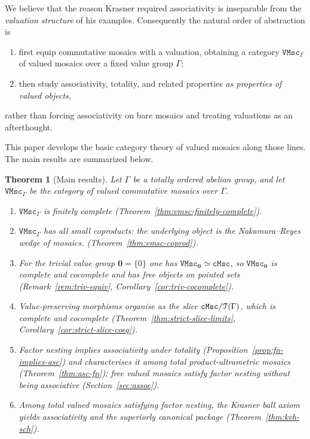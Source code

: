 \documentclass[11pt]{amsart}
\theoremstyle{plain}
\newtheorem{theorem}{Theorem}[section]
\theoremstyle{definition}
\theoremstyle{remark}
\newcommand{\T}{\EuScript{T}}
\newcommand{\cMsc}{\mathtt{cMsc}}
\newcommand{\VMsc}{\mathtt{VMsc}}
\newcommand{\VMscG}{\mathtt{VMsc}_{\Gamma}}
\begin{document}
We believe that the reason Krasner required associativity is inseparable from the \emph{valuation structure} of his examples. Consequently the natural order of abstraction is
\begin{enumerate}[label=(\roman*)]
\item first equip commutative mosaics with a valuation, obtaining a category \(\VMscG\) of valued mosaics over a fixed value group \(\Gamma\);
\item then study associativity, totality, and related properties \emph{as properties of valued objects},
\end{enumerate}
rather than forcing associativity on bare mosaics and treating valuations as an afterthought.

This paper develops the basic category theory of valued mosaics along those lines. The main results are summarized below.

\begin{theorem}[Main results]
\label{thm:intro-main}
Let \(\Gamma\) be a totally ordered abelian group, and let \(\VMscG\) be the category of valued commutative mosaics over \(\Gamma\).
\begin{enumerate}[label=(\alph*)]
\item\label{intro-a} \(\VMscG\) is finitely complete (Theorem~\ref{thm:vmsc-finitely-complete}).
\item\label{intro-b} \(\VMscG\) has all small coproducts: the underlying object is the Nakamura--Reyes wedge of mosaics. (Theorem~\ref{thm:vmsc-coprod}).
\item\label{intro-c} For the trivial value group \(\mathbf{0}=\{0\}\) one has \(\VMsc_{\mathbf{0}}\simeq\cMsc\), so \(\VMsc_{\mathbf{0}}\) is complete and cocomplete and has free objects on pointed sets (Remark~\ref{rem:triv-equiv}, Corollary~\ref{cor:triv-cocomplete}).
\item\label{intro-d} Value-preserving morphisms organise as the slice \(\cMsc/\T(\Gamma)\), which is complete and cocomplete (Theorem~\ref{thm:strict-slice-limits}, Corollary~\ref{cor:strict-slice-coeq}).
\item\label{intro-e} Factor nesting implies associativity under totality (Proposition~\ref{prop:fn-implies-asc}) and characterises it among total product-ultrametric mosaics (Theorem~\ref{thm:asc-fn}); free valued mosaics satisfy factor nesting without being associative (Section~\ref{sec:assoc}).
\item\label{intro-f} Among total valued mosaics satisfying factor nesting, the Krasner ball axiom yields associativity and the superiorly canonical package (Theorem~\ref{thm:kvh-sch}).
\end{enumerate}
\end{theorem}
\end{document}
